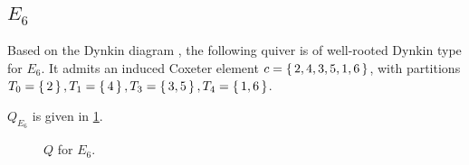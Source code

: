 \documentclass{amsart}
\theoremstyle{plain}
\theoremstyle{definition}
\theoremstyle{remark}
\newcommand{\inldynkinEsix}{\raisebox{-0.7ex}{}}
\begin{document}
  \subsection{\texorpdfstring{$E_6$}{E\_6}}

  Based on the Dynkin diagram \inldynkinEsix, the following quiver is of
  well-rooted Dynkin type for $E_6$. It admits an induced Coxeter
  element $c = \set{2,4,3,5,1,6}$, with partitions $T_0 = \set{2}, T_1 =
  \set{4}, T_3 = \set{3,5}, T_4 = \set{1,6}$.

  {\centering 

  } $Q_{E_6}$ is given in \cref{fig:QE6}.

  \begin{figure}
    \centering 

    \caption{$Q$ for $E_6$.
      \label{fig:QE6}
    }
  \end{figure}
\end{document}

